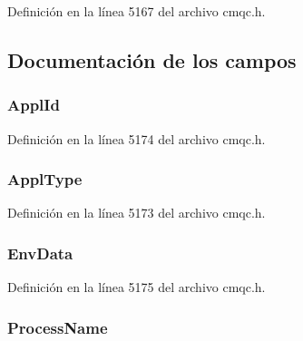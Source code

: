 Definición en la línea 5167 del archivo cmqc.\+h.



\subsection{Documentación de los campos}
\hypertarget{structtag_m_q_t_m_a85937497c4f82d120501b04deb4558a8}{}
\subsubsection[{Appl\+Id}]{ Appl\+Id}\label{structtag_m_q_t_m_a85937497c4f82d120501b04deb4558a8}


Definición en la línea 5174 del archivo cmqc.\+h.

\hypertarget{structtag_m_q_t_m_ac4a26a88d1b56f6de408154b461942b9}{}
\subsubsection[{Appl\+Type}]{ Appl\+Type}\label{structtag_m_q_t_m_ac4a26a88d1b56f6de408154b461942b9}


Definición en la línea 5173 del archivo cmqc.\+h.

\hypertarget{structtag_m_q_t_m_a852305187782d8464d769e32f9267f12}{}
\subsubsection[{Env\+Data}]{ Env\+Data}\label{structtag_m_q_t_m_a852305187782d8464d769e32f9267f12}


Definición en la línea 5175 del archivo cmqc.\+h.

\hypertarget{structtag_m_q_t_m_a45e2a82a9d94471dd5e7f07d814b4bfb}{}
\subsubsection[{Process\+Name}]{ Process\+Name}\label{structtag_m_q_t_m_a45e2a82a9d94471dd5e7f07d814b4bfb}


